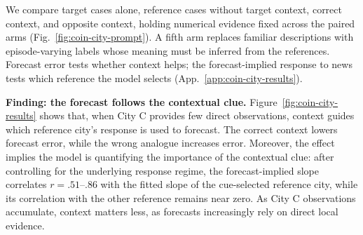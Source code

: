We compare target cases alone, reference cases without target context, correct
context, and opposite context, holding numerical evidence fixed across the paired
arms (Fig.~\ref{fig:coin-city-prompt}). A fifth arm replaces familiar descriptions
with episode-varying labels whose meaning must be inferred from the references.
Forecast error tests whether context helps; the forecast-implied response to news
tests which reference the model selects (App.~\ref{app:coin-city-results}).

\noindent\textbf{Finding: the forecast follows the contextual clue.}
Figure~\ref{fig:coin-city-results} shows that, when City C provides few direct
observations, context guides which reference city's response is used to forecast.
The correct context lowers forecast error, while the wrong analogue increases
error. Moreover, the effect implies the model is quantifying the importance of
the contextual clue: after controlling for the underlying response regime, the
forecast-implied slope correlates $r=.51$--$.86$ with the fitted slope of the
cue-selected reference city, while its correlation with the other reference
remains near zero. As City C observations accumulate, context matters less, as
forecasts increasingly rely on direct local evidence.

